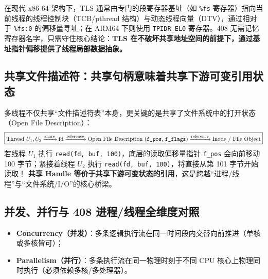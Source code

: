 \documentclass[11pt,a4paper]{ctexart}
\newcommand{\kw}[1]{\textbf{#1}}
\newcommand{\code}[1]{\texttt{#1}}
\begin{document}
\begin{eng}
在现代 x86-64 架构下，TLS 通常由专门的段寄存器基址（如 \code{\%fs} 寄存器）指向当前线程的线程控制块（TCB/pthread 结构）与动态线程向量（DTV），通过相对于 \code{\%fs:0} 的偏移量寻址；在 ARM64 下则使用 \code{TPIDR\_EL0} 寄存器。408 无需记忆寄存器名字，只需守住核心结论：\kw{TLS 在不破坏共享地址空间的前提下，通过基址指针偏移提供了线程局部数据抽象。}
\end{eng}

\subsection{共享文件描述符：共享句柄意味着共享下游可变引用状态}

多线程不仅共享“文件描述符表”本身，更关键的是共享了文件系统中的打开状态（Open File Description）：
\[
\boxed{
\text{Thread } U_1, U_2
\xrightarrow{\text{share}}
\text{fd}
\xrightarrow{\text{reference}}
\text{Open File Description (\texttt{f\_pos}, \texttt{f\_flags})}
\xrightarrow{\text{reference}}
\text{Inode / File Object}
}
\]
若线程 $U_1$ 执行 \code{read(fd, buf, 100)}，底层的读取偏移量指针 \code{f\_pos} 会向前移动 100 字节；紧接着线程 $U_2$ 执行 \code{read(fd, buf, 100)}，将直接从第 101 字节开始读取！
\kw{共享 Handle 等价于共享下游可变状态的引用}，这是跨越“进程/线程”与“文件系统/I/O”的核心桥梁。

\subsection{并发、并行与 408 进程/线程全维度对照}

\begin{itemize}
\item \kw{Concurrency（并发）}：多条逻辑执行流在同一时间段内交替向前推进（单核或多核皆可）；
\item \kw{Parallelism（并行）}：多条执行流在同一物理时刻于不同 CPU 核心上物理同时执行（必须依赖多核/多处理器）。
\end{itemize}
\end{document}
